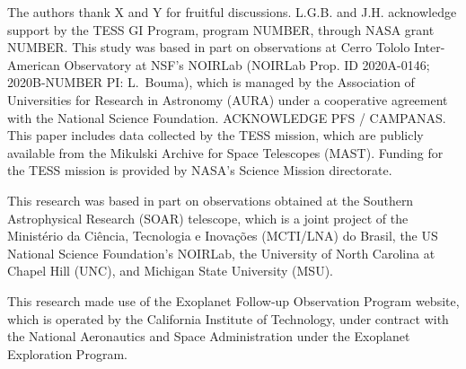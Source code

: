 \documentclass[12pt,twocolumn,tighten]{aastex63}
\begin{document}


\acknowledgements
\raggedbottom

The authors thank X and Y for fruitful discussions.
%
L.G.B. and J.H. acknowledge support by the TESS GI Program, program
NUMBER, through NASA grant NUMBER.
%
This study was based in part on observations at Cerro Tololo
Inter-American Observatory at NSF's NOIRLab (NOIRLab Prop. ID
2020A-0146; 2020B-NUMBER PI: L{.}~Bouma), which is managed by the
Association of Universities for Research in Astronomy (AURA) under a
cooperative agreement with the National Science Foundation.
%
ACKNOWLEDGE PFS / CAMPANAS.
%
This paper includes data collected by the TESS mission, which are
publicly available from the Mikulski Archive for Space Telescopes
(MAST).
%
Funding for the TESS mission is provided by NASA's Science Mission
directorate.
%

%
%

This research was based in part on observations obtained at the
Southern Astrophysical Research (SOAR) telescope, which is a joint
project of the Minist\'{e}rio da Ci\^{e}ncia, Tecnologia e
Inova\c{c}\~{o}es (MCTI/LNA) do Brasil, the US National Science
Foundation's NOIRLab, the University of North Carolina at Chapel Hill
(UNC), and Michigan State University (MSU).

This research made use of the Exoplanet Follow-up Observation
Program website, which is operated by the California Institute of
Technology, under contract with the National Aeronautics and Space
Administration under the Exoplanet Exploration Program.
\end{document}
